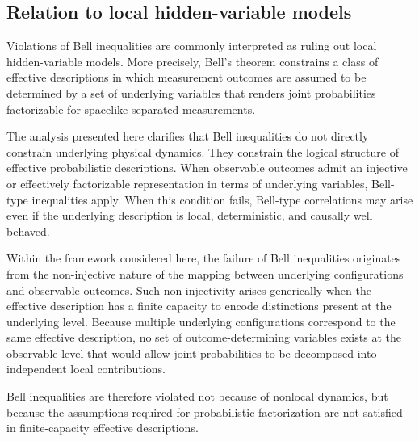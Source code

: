 \subsection{Relation to local hidden-variable models}
  \label{subsec:lhv-relation}

  Violations of Bell inequalities are commonly interpreted as ruling out local
  hidden-variable models.
  More precisely, Bell’s theorem constrains a class of effective descriptions in which
  measurement outcomes are assumed to be determined by a set of underlying variables
  that renders joint probabilities factorizable for spacelike separated measurements.

  The analysis presented here clarifies that Bell inequalities do not directly constrain
  underlying physical dynamics.
  They constrain the logical structure of effective probabilistic descriptions.
  When observable outcomes admit an injective or effectively factorizable representation
  in terms of underlying variables, Bell-type inequalities apply.
  When this condition fails, Bell-type correlations may arise even if the underlying
  description is local, deterministic, and causally well behaved.

  Within the framework considered here, the failure of Bell inequalities originates
  from the non-injective nature of the mapping between underlying configurations and
  observable outcomes.
  Such non-injectivity arises generically when the effective description has a finite
  capacity to encode distinctions present at the underlying level.
  Because multiple underlying configurations correspond to the same effective
  description, no set of outcome-determining variables exists at the observable level
  that would allow joint probabilities to be decomposed into independent local
  contributions.

  Bell inequalities are therefore violated not because of nonlocal dynamics, but
  because the assumptions required for probabilistic factorization are not satisfied
  in finite-capacity effective descriptions.
